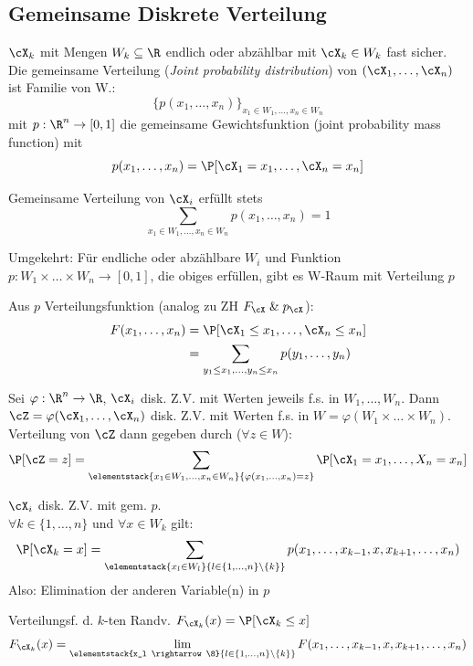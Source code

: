 \subsection{Gemeinsame Diskrete Verteilung}
\shortdefinition $\cX_k$ mit Mengen $W_k \subseteq \R$ endlich oder abzählbar mit $\cX_k \in W_k$ fast sicher.
Die gemeinsame Verteilung (\textit{Joint probability distribution}) von $(\cX_1, \ldots, \cX_n)$ ist Familie von W.:
\[
    \{ p(x_1, \ldots, x_n) \}_{x_1 \in W_1, \ldots, x_n \in W_n}
\]
mit $p : \R^n \rightarrow [0, 1]$ die gemeinsame Gewichtsfunktion (joint probability mass function) mit
\[
    p(x_1, \ldots, x_n) = \P[\cX_1 = x_1, \ldots, \cX_n = x_n]
\]

\shorttheorem Gemeinsame Verteilung von $\cX_i$ erfüllt stets
\[
    \sum_{x_1 \in W_1, \ldots, x_n \in W_n} p(x_1, \ldots, x_n) = 1
\]

\shortremark Umgekehrt: Für endliche oder abzählbare $W_i$ und Funktion $p : W_1 \times \ldots \times W_n \rightarrow [0, 1]$, die obiges erfüllen, gibt es W-Raum mit Verteilung $p$

\shortproposition Aus $p$ Verteilungsfunktion (analog zu ZH $F_\cX \; \& \; p_\cX$):
\begin{align*}
    F(x_1, \ldots, x_n) & = \P[\cX_1 \leq x_1, \ldots, \cX_n \leq x_n]                    \\
                        & = \sum_{y_1 \leq x_1, \ldots, y_n \leq x_n} p(y_1, \ldots, y_n)
\end{align*}

 Sei $\varphi : \R^n \rightarrow \R$, $\cX_i$ disk. Z.V. mit Werten jeweils f.s. in $W_1, \ldots, W_n$.
Dann $\cZ = \varphi(\cX_1, \ldots, \cX_n)$ disk. Z.V. mit Werten f.s. in $W = \varphi(W_1 \times \ldots \times W_n)$. Verteilung von $\cZ$ dann gegeben durch ($\forall z \in W$):
\[
    \P[\cZ = z] = \sum_{\elementstack{x_1 \in W_1, \ldots, x_n \in W_n}{\varphi(x_1, \ldots, x_n) = z}} \P[\cX_1 = x_1, \ldots, X_n = x_n]
\]

\shorttheorem[Randverteilung] $\cX_i$ disk. Z.V. mit gem. $p$.\\
$\forall k \in \{ 1, \ldots, n \}$ und $\forall x \in W_k$ gilt:
\[
    \P[\cX_k = x] = \sum_{\elementstack{x_l \in W_l}{l \in \{1, \ldots, n\} \backslash \{k\}}} p(x_1, \ldots, x_{k - 1}, x, x_{k + 1}, \ldots, x_n)
\]
{\scriptsize Also: Elimination der anderen Variable(n) in $p$}

\shortremark Verteilungsf. d. $k$-ten Randv. $F_{\cX_k}(x) = \P[\cX_k \leq x]$
\[
    F_{\cX_k}(x) = \lim_{\elementstack{x_l \rightarrow \8}{l \in \{ 1, \ldots, n \} \backslash \{ k \}}} F(x_1, \ldots, x_{k - 1}, x, x_{k + 1}, \ldots, x_n)
\]

